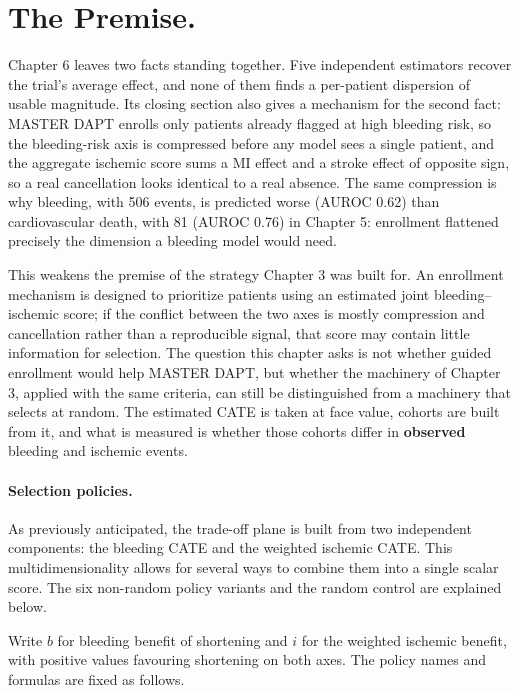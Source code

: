 
\section{The Premise.}
\label{sec:ch8-premise}

Chapter 6 leaves two facts standing together. Five independent estimators
recover the
trial's average effect, and none of them finds a per-patient dispersion of usable magnitude. 
Its closing section also gives a
mechanism for the second fact: MASTER DAPT enrolls only patients already flagged at high
bleeding risk, so the bleeding-risk axis is compressed before any model sees a single
patient, and the aggregate ischemic score sums a MI effect and a stroke effect of
opposite sign, so a real cancellation looks identical to a real absence. The same
compression is why bleeding, with 506 events, is predicted worse (AUROC 0.62) than
cardiovascular death, with 81 (AUROC 0.76) in Chapter 5: enrollment flattened precisely
the dimension a bleeding model would need.

\vspace{10pt}

This weakens the premise of the strategy Chapter 3 was built for. An enrollment
mechanism is designed to prioritize patients using an estimated joint bleeding--ischemic
score; if the conflict between the two axes is mostly compression and cancellation rather
than a reproducible signal, that score may contain little information for selection. The question
this chapter asks is not whether guided enrollment would help MASTER DAPT, but whether
the machinery of Chapter 3, applied with the same criteria, can still be distinguished
from a machinery that selects at random. The estimated CATE is taken at face value,
cohorts are built from it, and what is measured is whether those cohorts differ in
\textbf{observed} bleeding and ischemic events.

\paragraph{Selection policies.}
As previously anticipated, the trade-off plane is built from two independent components:
the bleeding CATE and the weighted ischemic CATE.
This multidimensionality allows for several ways to combine them into a single scalar score.
The six non-random policy variants and the random control are explained below.

Write $b$ for bleeding benefit of shortening and $i$ for the weighted ischemic
benefit, with positive values favouring shortening on both axes. The policy names and
formulas are fixed as follows.

